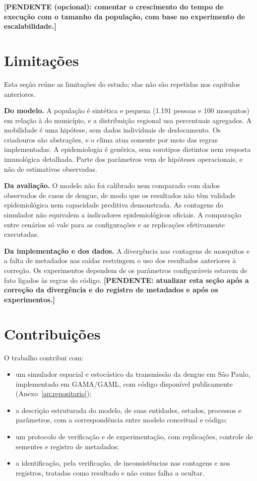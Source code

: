 \textbf{[PENDENTE (opcional): comentar o crescimento do tempo de execução com o tamanho da população, com base no experimento de escalabilidade.]}

\section{Limitações}

Esta seção reúne as limitações do estudo; elas não são repetidas nos capítulos anteriores.

\textbf{Do modelo.} A população é sintética e pequena (1.191 pessoas e 100 mosquitos) em relação à do município, e a distribuição regional usa percentuais agregados. A mobilidade é uma hipótese, sem dados individuais de deslocamento. Os criadouros são abstrações, e o clima atua somente por meio das regras implementadas. A epidemiologia é genérica, sem sorotipos distintos nem resposta imunológica detalhada. Parte dos parâmetros vem de hipóteses operacionais, e não de estimativas observadas.

\textbf{Da avaliação.} O modelo não foi calibrado nem comparado com dados observados de casos de dengue, de modo que os resultados não têm validade epidemiológica nem capacidade preditiva demonstrada. As contagens do simulador não equivalem a indicadores epidemiológicos oficiais. A comparação entre cenários só vale para as configurações e as replicações efetivamente executadas.

\textbf{Da implementação e dos dados.} A divergência nas contagens de mosquitos e a falta de metadados nas saídas restringem o uso dos resultados anteriores à correção. Os experimentos dependem de os parâmetros configuráveis estarem de fato ligados às regras do código. \textbf{[PENDENTE: atualizar esta seção após a correção da divergência e do registro de metadados e após os experimentos.]}

\section{Contribuições}

O trabalho contribui com:

\begin{itemize}
    \item um simulador espacial e estocástico da transmissão da dengue em São Paulo, implementado em GAMA/GAML, com código disponível publicamente (Anexo~\ref{ap:repositorio});
    \item a descrição estruturada do modelo, de suas entidades, estados, processos e parâmetros, com a correspondência entre modelo conceitual e código;
    \item um protocolo de verificação e de experimentação, com replicações, controle de sementes e registro de metadados;
    \item a identificação, pela verificação, de inconsistências nas contagens e nos registros, tratadas como resultado e não como falha a ocultar.
\end{itemize}

